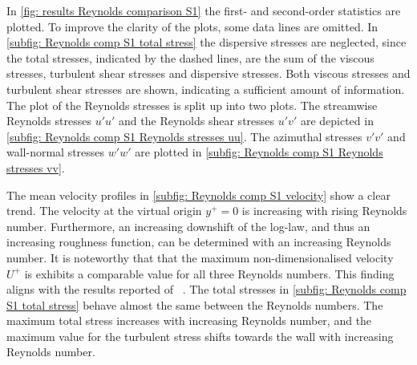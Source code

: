 In \autoref{fig: results Reynolds comparison S1} the first- and second-order statistics are plotted.
To improve the clarity of the plots, some data lines are omitted.
In \autoref{subfig: Reynolds comp S1 total stress} the dispersive stresses are neglected, since the total stresses, indicated by the dashed lines, are the sum of the  viscous stresses, turbulent shear stresses and dispersive stresses.
Both viscous stresses and turbulent shear stresses are shown, indicating a sufficient amount of information.
The plot of the Reynolds stresses is split up into two plots.
The streamwise Reynolds stresses $u'u'$ and the Reynolds shear stresses $u'v'$ are depicted in \autoref{subfig: Reynolds comp S1 Reynolds stresses uu}.
The  azimuthal stresses $v'v'$ and wall-normal stresses $w'w'$ are plotted in \autoref{subfig: Reynolds comp S1 Reynolds stresses vv}.


The mean velocity profiles in \autoref{subfig: Reynolds comp S1 velocity} show a clear trend.
The velocity at the virtual origin $y^+ = 0$ is increasing with rising Reynolds number.
Furthermore, an increasing downshift of the log-law, and thus an increasing roughness function, can be determined with an increasing Reynolds number.
It is noteworthy that that the maximum non-dimensionalised velocity $U^+$ is exhibits a comparable value  for all three Reynolds numbers. 
This finding aligns with the results reported of ~\cite{demaioDirectNumericalSimulation2023}.
The total stresses in \autoref{subfig: Reynolds comp S1 total stress} behave almost the same between the Reynolds numbers.
The maximum total stress increases with increasing Reynolds number, and the maximum value for the turbulent stress shifts  towards the wall with increasing Reynolds number.


